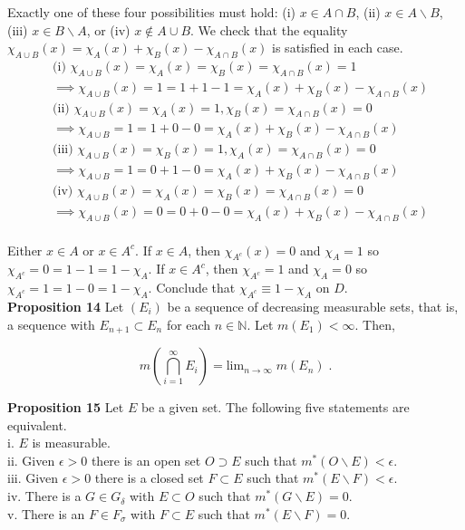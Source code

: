\documentclass[a4paper]{article}
\begin{document}
Exactly one of these four possibilities must hold: (i) $x \in A\cap B$, (ii) $x \in A\backslash B$, (iii) $x \in B\backslash A$, or (iv) $x \not\in A\cup B$. We check that the equality $\chi_{A\cup B}(x) = \chi_A(x) + \chi_B(x) - \chi_{A\cap B}(x)$ is satisfied in each case. \begin{align*}
&\text{(i) } \chi_{A\cup B}(x) = \chi_{A}(x) = \chi_{B}(x)  = \chi_{A\cap B}(x) = 1\\
&\implies \chi_{A\cup B}(x) = 1 = 1+1 - 1 = \chi_{A}(x) + \chi_{B}(x) - \chi_{A\cap B}(x) \\
&\text{(ii) } \chi_{A\cup B}(x) = \chi_{A}(x) = 1, \chi_{B}(x)  = \chi_{A\cap B}(x) = 0\\
&\implies \chi_{A\cup B} = 1 = 1+0 - 0 = \chi_{A}(x) + \chi_{B}(x) - \chi_{A\cap B}(x) \\
&\text{(iii) } \chi_{A\cup B}(x) = \chi_{B}(x) = 1, \chi_{A}(x)  = \chi_{A\cap B}(x) = 0 \\
&\implies \chi_{A\cup B} = 1 = 0+1 - 0 = \chi_{A}(x) + \chi_{B}(x) - \chi_{A\cap B}(x) \\
&\text{(iv) } \chi_{A\cup B}(x) = \chi_{A}(x) = \chi_{B}(x)  = \chi_{A\cap B}(x) = 0 \\
&\implies \chi_{A\cup B}(x) = 0 = 0+0-0= \chi_{A}(x) + \chi_{B}(x) - \chi_{A\cap B}(x) \\
\end{align*}

Either $x \in A$ or $x \in A^c$. If $x \in A$, then $\chi_{A^c}(x) = 0$ and $\chi_{A} = 1$ so $\chi_{A^c} = 0 = 1-1 = 1-\chi_{A}$. If $x \in A^c$, then $\chi_{A^c} = 1$ and $\chi_{A} = 0$ so $\chi_{A^c} = 1 = 1 - 0 = 1-\chi_{A}$. Conclude that $\chi_{A^c} \equiv 1- \chi_{A}$ on $D$. \\

{\bf Proposition 14} Let $(E_i)$ be a sequence of decreasing measurable sets, that is, a sequence with $E_{n+1} \subset E_n$ for each $n \in \mathbb{N}$. Let $m(E_1)<\infty$. Then,

$$m\left(\bigcap_{i=1}^\infty E_i \right) = \text{lim}_{n\rightarrow \infty} \; m(E_n) \;.$$

{\bf Proposition 15} Let $E$ be a given set. The following five statements are equivalent.\\

i. $E$ is measurable.\\
ii. Given $\epsilon > 0$ there is an open set $O \supset E$ such that $m^*(O \backslash E) < \epsilon$. \\
iii. Given $\epsilon > 0$ there is a closed set $F \subset E$ such that $m^*(E \backslash F) < \epsilon$.\\
iv. There is a $G \in G_{\delta}$ with $E \subset O$ such that $m^*(G \backslash E) = 0$.\\
v. There is an $F \in F_\sigma$ with $F \subset E$ such that $m^*(E \backslash F) = 0$. \\
\end{document}
